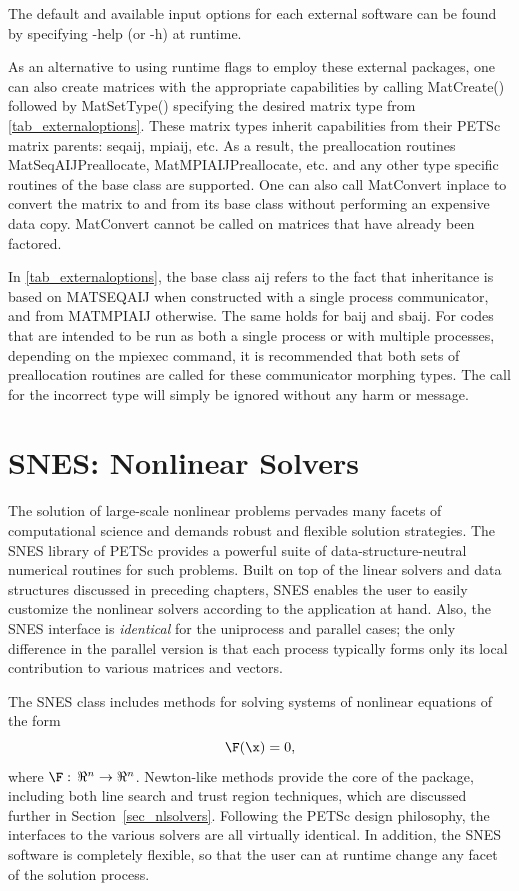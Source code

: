The default and available input options for each external software can be found
by specifying -help (or -h) at runtime.

As an alternative to using runtime flags to employ these external
packages, one can also create matrices with the appropriate
capabilities by calling MatCreate() followed by MatSetType()
specifying the desired matrix type from \ref{tab_externaloptions}.
These matrix types inherit capabilities from their PETSc matrix
parents: seqaij, mpiaij, etc.  As a result, the preallocation routines
MatSeqAIJPreallocate, MatMPIAIJPreallocate, etc. and any other type
specific routines of the base class are supported.  One can also
call MatConvert inplace to convert the matrix to and from its base
class without performing an expensive data copy.  MatConvert cannot be
called on matrices that have already been factored.

In \ref{tab_externaloptions}, the base class aij refers to the fact
that inheritance is based on MATSEQAIJ when constructed with a single
process communicator, and from MATMPIAIJ otherwise.  The same holds
for baij and sbaij.  For codes that are intended to be run as both a
single process or with multiple processes, depending on the mpiexec
command, it is recommended that both sets of preallocation routines
are called for these communicator morphing types.  The call for the
incorrect type will simply be ignored without any harm or message.


\cleardoublepage
\chapter{SNES: Nonlinear Solvers}
\label{chapter_snes}

The solution of large-scale nonlinear problems pervades many facets of
computational science and demands robust and flexible solution
strategies. The SNES library of PETSc provides a powerful suite of
data-structure-neutral numerical routines for such problems.  Built on
top of the linear solvers and data structures discussed in preceding
chapters, SNES enables the user to easily customize the nonlinear
solvers according to the application at hand.  Also, the SNES
interface is {\em identical} for the uniprocess and parallel cases;
the only difference in the parallel version is that each process
typically forms only its local contribution to various matrices and
vectors.

The SNES class includes methods for solving systems of nonlinear equations of the form 
\begin{equation}
\F(\x) = 0,
\label{eq_F=0}
\end{equation}
where $\F: \, \Re^n \to \Re^n$.
Newton-like methods provide the core of the package, including
 both line search  
and trust region  techniques, which are discussed
further in Section~\ref{sec_nlsolvers}. Following the
PETSc design philosophy, the interfaces to the various solvers are all
virtually identical. In addition, the SNES software is completely
flexible, so that the user can at runtime change any facet of the
solution process.


